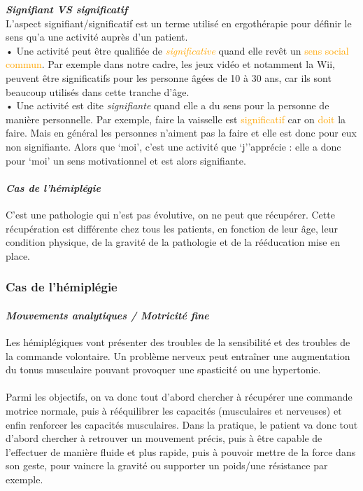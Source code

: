 	\textbf{\emph{Signifiant VS significatif}\\}
L’aspect signifiant/significatif est un terme utilisé en ergothérapie pour définir le sens qu'a une activité auprès d’un patient.\\
• Une activité peut être qualifiée de \emph{\textcolor{orange}{significative}} quand elle revêt un \textcolor{orange}{sens social commun}. Par exemple dans notre cadre, les jeux vidéo et notamment la Wii, peuvent être significatifs pour les personne âgées de 10 à 30 ans, car ils sont beaucoup utilisés dans cette tranche d'âge.\\
• Une activité est dite \emph{\textcolor{vert}{signifiante}} quand elle a du sens pour la personne de \textcolor{vert}{manière personnelle}. Par exemple, faire la vaisselle est \textcolor{orange}{significatif }car on \textcolor{orange}{doit} la faire. Mais en général les personnes n’aiment pas la faire et elle est donc pour eux non signifiante. Alors que ‘moi’, c'est une activité que ‘j’’apprécie :  elle a donc pour ‘moi’ un sens motivationnel et est alors signifiante.

	\paragraph{\emph{Cas de l’hémiplégie} \\}
C’est une pathologie qui n’est pas évolutive, on ne peut que récupérer. Cette récupération est différente chez tous les patients, en fonction de leur âge, leur condition physique, de la gravité de la pathologie et de la rééducation mise en place.

	\subsubsection{Cas de l'hémiplégie}
\paragraph{\emph{Mouvements analytiques / Motricité fine} \\ }
Les hémiplégiques vont présenter des troubles de la sensibilité et des troubles de la commande volontaire. Un problème nerveux peut entraîner une augmentation du tonus musculaire pouvant provoquer une spasticité ou une hypertonie. 

\paragraph{}
Parmi les objectifs, on va donc tout d’abord chercher à récupérer une commande motrice normale, puis à rééquilibrer les capacités (musculaires et nerveuses) et enfin renforcer les capacités musculaires. Dans la pratique, le patient va donc tout d’abord chercher à retrouver un mouvement précis, puis à être capable de l’effectuer de manière fluide et plus rapide, puis à pouvoir mettre de la force dans son geste, pour vaincre la gravité ou supporter un poids/une résistance par exemple.

